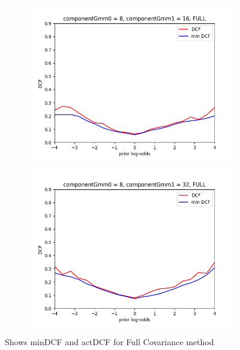 \begin{figure}[h!]
\begin{subfigure}[b]{0.23\linewidth}
        \label{fig:GMM216Full}
    \end{subfigure}
    \begin{subfigure}[b]{0.23\linewidth}
        \includegraphics[width=\linewidth]{Lab/10. Lab 10/Images/05. 8-16 Full}
        \label{fig:GMM816Full}
    \end{subfigure}
    \begin{subfigure}[b]{0.23\linewidth}
        \includegraphics[width=\linewidth]{Lab/10. Lab 10/Images/06. 8 - 32}
        \label{fig:GMM832Full}
    \end{subfigure}
    \caption{Shows minDCF and actDCF for Full Covariance method}
    \label{fig:GMMFullBest}
\end{figure}


